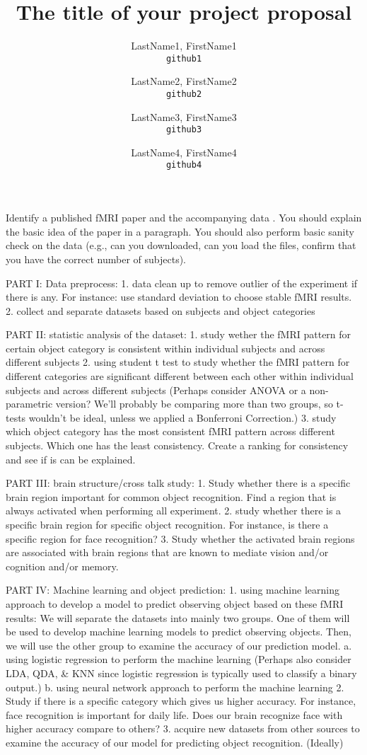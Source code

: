 \documentclass[11pt]{article}
\title{The title of your project proposal}
\author{
  LastName1, FirstName1\\
  \texttt{github1}
  \and
  LastName2, FirstName2\\
  \texttt{github2}
  \and
  LastName3, FirstName3\\
  \texttt{github3}
  \and
  LastName4, FirstName4\\
  \texttt{github4}
}
\begin{document}
\maketitle

Identify a published fMRI paper and the accompanying data
\cite{lindquist2008statistical}.  You should explain the basic idea of the
paper in a paragraph.  You should also perform basic sanity check on the data
(e.g., can you downloaded, can you load the files, confirm that you have the
correct number of subjects).



PART I: Data preprocess:
1. data clean up to remove outlier of the experiment if there is any.
For instance: use standard deviation to choose stable fMRI results.
2. collect and separate datasets based on subjects and object categories

PART II: statistic analysis of the dataset:
1. study wether the fMRI pattern for certain object category is consistent 
within individual subjects and across different subjects
2. using student t test to study whether the fMRI pattern for different 
categories are significant different between each other within individual 
subjects and across different subjects (Perhaps consider ANOVA or a non-
parametric version? We'll probably be comparing more than two groups, so t-tests
wouldn't be ideal, unless we applied a Bonferroni Correction.)
3. study which object category has the most consistent fMRI pattern across 
different subjects. Which one has the least consistency. 
Create a ranking for consistency and see if is can be explained.

PART III: brain structure/cross talk study:
1. Study whether there is a specific brain region important for common 
object recognition. Find a region that is always activated when 
performing all experiment.
2. study whether there is a specific brain region for specific object 
recognition. For instance, is there a specific region for face recognition?
3. Study whether the activated brain regions are associated with brain 
regions that are known to mediate vision and/or cognition and/or memory.

PART IV: Machine learning and object prediction:
1. using machine learning approach to develop a model to predict observing 
object based on these fMRI results:
We will separate the datasets into mainly two groups. One of them will 
be used to develop machine learning models to predict observing objects. 
Then, we will use the other group to examine the accuracy of our 
prediction model.
a. using logistic regression to perform the machine learning (Perhaps also
consider LDA, QDA, & KNN since logistic regression is typically used to classify
a binary output.)
b. using neural network approach to perform the machine learning
2. Study if there is a specific category which gives us higher accuracy. 
For instance, face recognition is important for daily life. 
Does our brain recognize face with higher accuracy compare to others?
3. acquire new datasets from other sources to examine the accuracy of 
our model for predicting object recognition. (Ideally)

 


\end{document}
